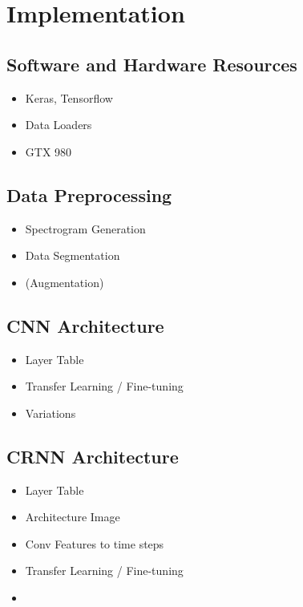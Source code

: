 \section{Implementation}

\subsection{Software and Hardware Resources}

    \begin{itemize}
        \item Keras, Tensorflow
        \item Data Loaders
        \item GTX 980
    \end{itemize}

\subsection{Data Preprocessing}

    \begin{itemize}
        \item Spectrogram Generation
        \item Data Segmentation
        \item (Augmentation)
    \end{itemize}

\subsection{CNN Architecture}

    \begin{itemize}
        \item Layer Table
        \item Transfer Learning / Fine-tuning
        \item Variations
    \end{itemize}

\subsection{CRNN Architecture}

    \begin{itemize}
        \item Layer Table
        \item Architecture Image
        \item Conv Features to time steps
        \item Transfer Learning / Fine-tuning
        \item 
    \end{itemize}
